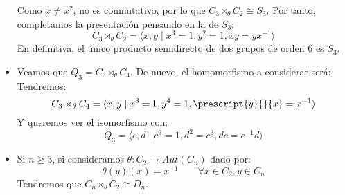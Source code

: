 \begin{ejemplo}
\begin{itemize}
            Como $x\neq x^2$, no es conmutativo, por lo que $C_3\rtimes_\theta C_2\cong S_3$. Por tanto, completamos la presentación pensando en la de $S_3$:
            \begin{equation*}
                C_3 \rtimes_\theta C_2 = \langle x,y\mid x^3=1, y^2 = 1, xy = yx^{-1} \rangle 
            \end{equation*}
            En definitiva, el único producto semidirecto de dos grupos de orden 6 es $S_3$.
        \item Veamos que $Q_3 = C_3\rtimes_\theta C_4$. De nuevo, el homomorfismo a considerar será:
            Tendremos:
            \begin{equation*}
                C_3\rtimes_\theta C_4 = \langle x,y\mid x^3=1, y^4 = 1, \prescript{y}{}{x}= x^{-1} \rangle 
            \end{equation*}
            Y queremos ver el isomorfismo con:
            \begin{equation*}
                Q_3 = \langle c,d\mid c^6=1, d^2 = c^3, dc=c^{-1}d \rangle 
            \end{equation*}
        \item Si $n\geq 3$, si consideramos $\theta:C_2\to Aut(C_n)$ dado por:
            \begin{equation*}
                \theta(y)(x) = x^{-1} \qquad \forall x\in C_2, y\in C_n
            \end{equation*}
            Tendremos que $C_n\rtimes_\theta C_2 \cong D_n$.
    \end{itemize}
\end{ejemplo}

